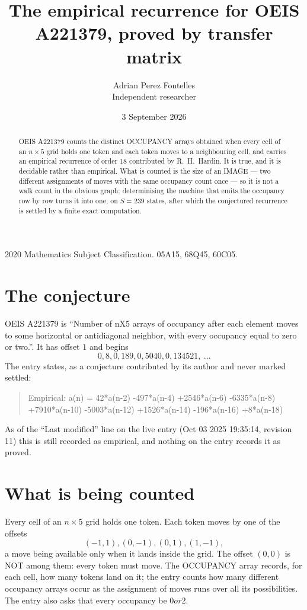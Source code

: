\documentclass[11pt,a4paper]{article}
\title{The empirical recurrence for OEIS A221379, proved by transfer matrix}
\author{Adrian Perez Fontelles\\ \small Independent researcher}
\date{3 September 2026}
\theoremstyle{plain}
\theoremstyle{definition}
\begin{document}
\maketitle

\begin{abstract}
OEIS A221379 counts the distinct OCCUPANCY arrays obtained when every cell of an $n\times5$ grid
holds one token and each token moves to a neighbouring cell, and carries an empirical
recurrence of order $18$ contributed by R.~H.~Hardin. It is true, and it is decidable
rather than empirical. What is counted is the size of an IMAGE --- two different assignments of
moves with the same occupancy count once --- so it is not a walk count in the obvious graph;
determinising the machine that emits the occupancy row by row turns it into one, on $S=239$
states, after which the conjectured recurrence is settled by a finite exact computation.
\end{abstract}

\noindent\small 2020 Mathematics Subject Classification. 05A15, 68Q45, 60C05.\normalsize

\section{The conjecture}

OEIS A221379 is ``Number of nX5 arrays of occupancy after each element moves to some horizontal or antidiagonal neighbor, with every occupancy equal to zero or two.''. It has offset $1$ and begins
\[
0, 8, 0, 189, 0, 5040, 0, 134521,\ \dots
\]
The entry states, as a conjecture contributed by its author and never marked settled:
\begin{quote}
Empirical: a(n) = 42*a(n-2) -497*a(n-4) +2546*a(n-6) -6335*a(n-8) +7910*a(n-10) -5003*a(n-12) +1526*a(n-14) -196*a(n-16) +8*a(n-18)
\end{quote}
As of the ``Last modified'' line on the live entry (Oct 03 2025 19:35:14, revision 11) this is still
recorded as empirical, and nothing on the entry records it as proved.

\section{What is being counted}

Every cell of an $n\times5$ grid holds one token. Each token moves by one of the offsets
\[
(-1,1), (0,-1), (0,1), (1,-1),
\]
a move being available only when it lands inside the grid. The offset $(0,0)$ is NOT among them: every token must move. The OCCUPANCY array
records, for each cell, how many tokens land on it; the entry counts how many different
occupancy arrays occur as the assignment of moves runs over all its possibilities. The entry also asks that every occupancy be $0 or 2$.
\end{document}
